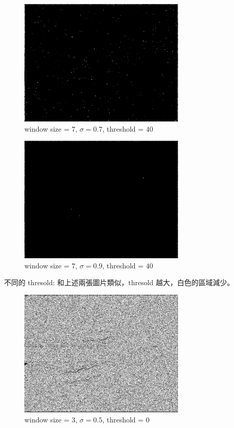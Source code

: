 \documentclass[conference]{IEEEtran}
\begin{document}
\begin{figure}[H]
\centerline{\includegraphics[width=8cm]{dentalXray07.png}}
\caption{window size = $7$, $\sigma=0.7$,  threshold = $40$}
\label{dentalXray07}
\end{figure}

\begin{figure}[H]
\centerline{\includegraphics[width=8cm]{dentalXray08.png}}
\caption{window size = $7$, $\sigma=0.9$,  threshold = $40$}
\label{dentalXray08}
\end{figure}

不同的 thresold: 和上述兩張圖片類似，thresold 越大，白色的區域減少。

\begin{figure}[H]
\centerline{\includegraphics[width=8cm]{dentalXray09.png}}
\caption{window size = $3$, $\sigma=0.5$,  threshold = $0$}
\label{dentalXray9}
\end{figure}
\end{document}

